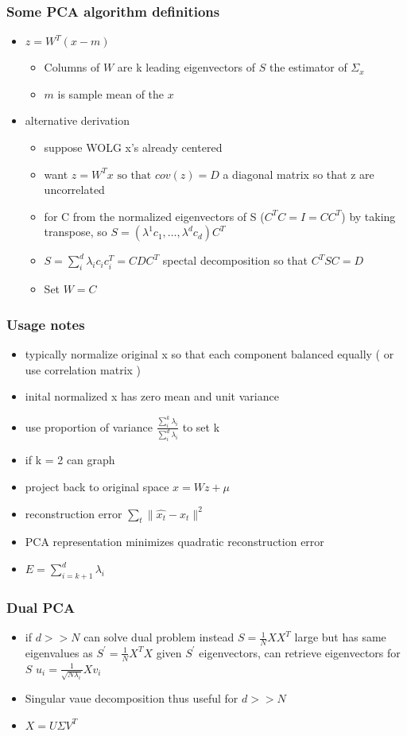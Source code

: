 \documentclass{beamer}
\begin{document}
  \begin{frame}
    \frametitle{Some PCA algorithm definitions}
    \begin{itemize}
    \item $z=W^T(x-m)$
      \begin{itemize}
      \item Columns of $W$ are k leading eigenvectors of $S$ the estimator of $\Sigma_x$
      \item $m$ is sample mean of the $x$
      \end{itemize}
    \item alternative derivation
      \begin{itemize}
      \item suppose WOLG x's already centered
      \item want $z=W^T x \text{ so that }cov( z) = D$  a diagonal matrix so that z are uncorrelated
      \item for C  from the normalized eigenvectors of S ($C^TC=I=CC^T$) by taking transpose, so $S=(\lambda^1c_1,\ldots,\lambda^dc_d)C^T$
      \item $S=\sum_i^d \lambda_i c_i c_i^T=C D C^T$ spectal decomposition so that $C^T SC =D$
      \item Set $W=C$
      \end{itemize}
    \end{itemize}
  \end{frame}

  \begin{frame}
    \frametitle{Usage notes}
    \begin{itemize}
    \item typically normalize original x so that each component balanced equally ( or use correlation matrix )
    \item inital normalized x has zero mean and unit variance
      \item use proportion of variance $\frac{\sum_i^k\lambda_i}{\sum_i^d\lambda_i}$ to set k
      \item if k = 2 can graph
      \item project back to original space $x=W z+\mu$
      \item reconstruction error $\sum_t\parallel \hat{x_t} - x_t\parallel^2$
      \item PCA representation minimizes quadratic reconstruction error
        \item $E=\sum_{i=k+1}^d \lambda_i$
    \end{itemize}
  \end{frame}
  \begin{frame}
    \frametitle{Dual PCA}
    \begin{itemize}
    \item if $d>>N$ can solve dual problem instead  $S=\frac{1}{N}X X^T$ large but has same eigenvalues as $S^\prime=\frac{1}{N}X^T X$ given $S^\prime$ eigenvectors, can retrieve eigenvectors for $S$ $u_i=\frac{1}{\sqrt{N \lambda_i}}Xv_i$
    \item Singular vaue decomposition thus useful for $d>>N$
    \item $X=U\Sigma V^T$
    \end{itemize}
  \end{frame}
\end{document}
